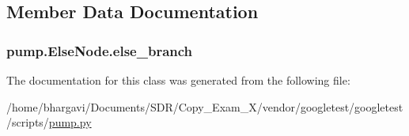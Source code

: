 \subsection{Member Data Documentation}
\subsubsection[{\texorpdfstring{else\+\_\+branch}{else_branch}}]{\setlength{\rightskip}{0pt plus 5cm}pump.\+Else\+Node.\+else\+\_\+branch}\hypertarget{classpump_1_1_else_node_ac838a0fe9f5d713c7f56939eed5e128d}{}\label{classpump_1_1_else_node_ac838a0fe9f5d713c7f56939eed5e128d}


The documentation for this class was generated from the following file\+:\begin{DoxyCompactItemize}
\item 
/home/bhargavi/\+Documents/\+S\+D\+R/\+Copy\+\_\+\+Exam\+\_\+X/vendor/googletest/googletest/scripts/\hyperlink{pump_8py}{pump.\+py}\end{DoxyCompactItemize}
